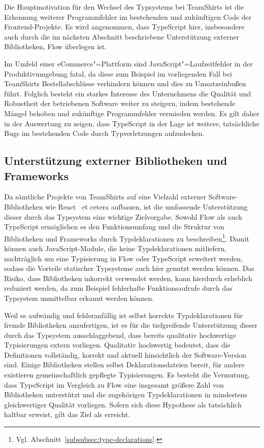 Die Hauptmotivation für den Wechsel des Typsystems bei TeamShirts ist die Erkennung weiterer Programmfehler im bestehenden und zukünftigen Code der Frontend-Projekte. Es wird angenommen, dass TypeScript hier, insbesondere auch durch die im nächsten Abschnitt beschriebene Unterstützung externer Bibliotheken, Flow überlegen ist.

Im Umfeld einer eCommerce"=Plattform sind JavaScript"=Laufzeitfehler in der Produktivumgebung fatal, da diese zum Beispiel im vorliegenden Fall bei TeamShirts Bestellabschlüsse verhindern können und dies zu Umsatzeinbußen führt. Folglich besteht ein starkes Interesse des Unternehmens die Qualität und Robustheit der betriebenen Software weiter zu steigern, indem bestehende Mängel behoben und zukünftige Programmfehler vermieden werden. Es gilt daher in der Auswertung zu zeigen, dass TypeScript in der Lage ist weitere, tatsächliche Bugs im bestehenden Code durch Typverletzungen aufzudecken.

\subsection{Unterstützung externer Bibliotheken und Frameworks}

Da sämtliche Projekte von TeamShirts auf eine Vielzahl externer Software-Bibliotheken wie React~\autocite{SOFTWARE:REACT} et cetera aufbauen, ist die umfassende Unterstützung dieser durch das Typsystem eine wichtige Zielvorgabe. Sowohl Flow als auch TypeScript ermöglichen es den Funktionsumfang und die Struktur von Bibliotheken und Frameworks durch Typdeklarationen zu beschreiben\footnote{Vgl. Abschnitt~\ref{subsubsec:type-declarations}.}. Damit können auch JavaScript-Module, die keine Typdeklarationen mitliefern, nachträglich um eine Typisierung in Flow oder TypeScript erweitert werden, sodass die Vorteile statischer Typsysteme auch hier genutzt werden können. Das Risiko, dass Bibliotheken inkorrekt verwendet werden, kann hierdurch erheblich reduziert werden, da zum Beispiel fehlerhafte Funktionsaufrufe durch das Typsystem unmittelbar erkannt werden können.

Weil es aufwändig und fehleranfällig ist selbst korrekte Typdeklarationen für fremde Bibliotheken anzufertigen, ist es für die tiefgreifende Unterstützung dieser durch das Typsystem ausschlaggebend, dass bereits qualitativ hochwertige Typisierungen extern vorliegen. Qualitativ hochwertig bedeutet, dass die Definitionen vollständig, korrekt und aktuell hinsichtlich der Software-Version sind. Einige Bibliotheken stellen selbst Deklarationsdateien bereit, für andere existieren gemeinschaftlich gepflegte Typisierungen. Es besteht die Vermutung, dass TypeScript im Vergleich zu Flow eine insgesamt größere Zahl von Bibliotheken unterstützt und die zugehörigen Typdeklarationen in mindestens gleichwertiger Qualität vorliegen. Sofern sich diese Hypothese als tatsächlich haltbar erweist, gilt das Ziel als erreicht.

